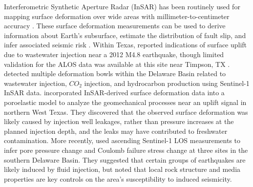 \documentclass{utexasthesis}
\begin{document}
Interferometric Synthetic Aperture Radar (InSAR) has been routinely used for mapping surface deformation over wide areas with millimeter-to-centimeter accuracy \citep{Massonnet1993DisplacementFieldLanders, Buergmann2000SyntheticApertureRadar}.  These surface deformation measurements can be used to derive information about Earth's subsurface, estimate the distribution of fault slip, and infer associated seismic risk \citep{Segall2010EarthquakeVolcanoDeformation, Elliott2016RoleSpaceBased, Huang2017FaultGeometryInversion}. Within Texas, \cite{Shirzaei2016SurfaceUpliftTime} reported indications of surface uplift due to wastewater injection near a 2012 M4.8 earthquake, though limited validation for the ALOS data was available at this site near Timpson, TX \cite{Semple2017IncompleteInventorySuspected}. \cite{Kim2018AssociationLocalizedGeohazards} detected multiple deformation bowls within the Delaware Basin related to wastewater injection, $CO_2$ injection, and hydrocarbon production using Sentinel-1 InSAR data. \cite{Zheng2019WastewaterLeakageWest} incorporated InSAR-derived surface deformation data into a poroelastic model to analyze the geomechanical processes near an uplift signal in northern West Texas. They discovered that the observed surface deformation was likely caused by injection well leakages, rather than pressure increases at the planned injection depth, and the leaks may have contributed to freshwater contamination. More recently, \cite{Deng2020SurfaceDeformationInduced} used ascending Sentinel-1 LOS measurements to infer pore pressure change and Coulomb failure stress change at three sites in the southern Delaware Basin. They suggested that certain groups of earthquakes are likely induced by fluid injection, but noted that local rock structure and media properties are key controls on the area's susceptibility to induced seismicity.
\end{document}
